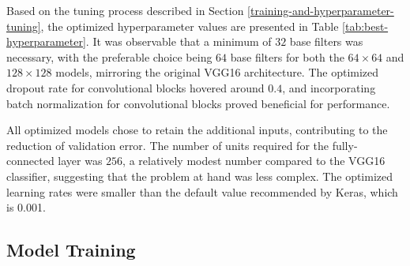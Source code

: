 \documentclass[]{interact}
\theoremstyle{plain}%
\theoremstyle{definition}
\theoremstyle{remark}
\begin{document}
Based on the tuning process described in Section
\ref{training-and-hyperparameter-tuning}, the optimized hyperparameter
values are presented in Table \ref{tab:best-hyperparameter}. It was
observable that a minimum of \(32\) base filters was necessary, with the
preferable choice being \(64\) base filters for both the
\(64 \times 64\) and \(128 \times 128\) models, mirroring the original
VGG16 architecture. The optimized dropout rate for convolutional blocks
hovered around \(0.4\), and incorporating batch normalization for
convolutional blocks proved beneficial for performance.

All optimized models chose to retain the additional inputs, contributing
to the reduction of validation error. The number of units required for
the fully-connected layer was \(256\), a relatively modest number
compared to the VGG16 classifier, suggesting that the problem at hand
was less complex. The optimized learning rates were smaller than the
default value recommended by Keras, which is 0.001.

\begin{table}

\caption{\label{tab:best-hyperparameter}Hyperparameters values for the optimized computer vision models with different input sizes.}
\centering
{}
\end{table}

\subsection{Model Training}\label{model-training}
\end{document}
